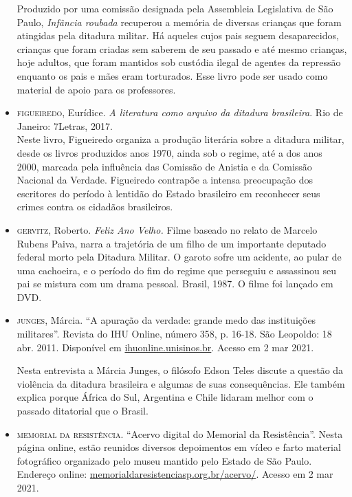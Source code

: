 \documentclass[12pt]{extarticle}
\begin{document}
\begin{itemize}
Produzido por uma comissão designada pela Assembleia Legislativa de São
Paulo, \emph{Infância roubada} recuperou a memória de diversas crianças
que foram atingidas pela ditadura militar. Há aqueles cujos pais seguem
desaparecidos, crianças que foram criadas sem saberem de seu passado e
até mesmo crianças, hoje adultos, que foram mantidos sob custódia ilegal
de agentes da repressão enquanto os pais e mães eram torturados. Esse
livro pode ser usado como material de apoio para os professores.

\item \textsc{figueiredo}, Eurídice. \emph{A literatura como arquivo da ditadura
brasileira}. Rio de Janeiro: 7Letras, 2017.\\

Neste livro, Figueiredo organiza a produção literária sobre a ditadura
militar, desde os livros produzidos anos 1970, ainda sob o regime, até a
dos anos 2000, marcada pela influência das Comissão de Anistia e da
Comissão Nacional da Verdade. Figueiredo contrapõe a intensa preocupação
dos escritores do período à lentidão do Estado brasileiro em reconhecer
seus crimes contra os cidadãos brasileiros.

\item \textsc{gervitz}, Roberto. \emph{Feliz Ano Velho.} Filme baseado no relato de Marcelo Rubens Paiva, narra a trajetória de um filho de um importante deputado federal morto pela Ditadura Militar. O garoto sofre um acidente, ao pular de uma cachoeira, e o período do fim do regime que perseguiu e assassinou seu pai se mistura com um drama pessoal. Brasil, 1987. O filme foi lançado em DVD. 

\item \textsc{junges}, Márcia. ``A apuração da verdade: grande medo das instituições
militares''. Revista do IHU Online, número 358, p. 16-18. São Leopoldo:
18 abr. 2011. Disponível em
\href{http://www.ihuonline.unisinos.br/media/pdf/IHUOnlineEdicao358.pdf}{{ihuonline.unisinos.br}}.
Acesso em 2 mar 2021.

Nesta entrevista a Márcia Junges, o filósofo Edson Teles discute a
questão da violência da ditadura brasileira e algumas de suas
consequências. Ele também explica porque África do Sul, Argentina e
Chile lidaram melhor com o passado ditatorial que o Brasil.

\item \textsc{memorial da resistência}. ``Acervo digital do Memorial da Resistência''. Nesta página online, estão reunidos diversos depoimentos em vídeo e farto material fotográfico organizado pelo museu mantido pelo Estado de São Paulo. Endereço online: \href{http://http://memorialdaresistenciasp.org.br/acervo/}{{memorialdaresistenciasp.org.br/acervo/}}.
Acesso em 2 mar 2021.


\end{itemize}
\end{document}
